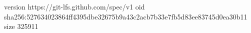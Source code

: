 version https://git-lfs.github.com/spec/v1
oid sha256:527634023864ff4395dbe32675b9a43c2acb7b33e7fb5d83ee83745d0ea30b11
size 325911
